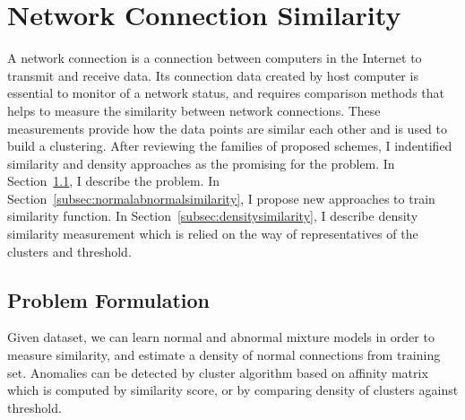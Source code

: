 \section{Network Connection Similarity}
\label{sec:connectionsimilarity}
A network connection is a connection between computers in the Internet to transmit and receive data. 
Its connection data created by host computer is essential to monitor of a network status, and requires comparison methods that helps to measure the similarity between network connections. 
These measurements provide how the data points are similar each other and is used to build a clustering. 
After reviewing the families of proposed schemes, I indentified similarity and density approaches as the promising for the problem.
\newline
In Section~\ref{subsec:problemformulation}, I describe the problem.\newline
In Section~\ref{subsec:normalabnormalsimilarity}, I propose new approaches to train similarity function.\newline
In Section~\ref{subsec:densitysimilarity}, I describe density similarity measurement which is relied on the way of representatives of the clusters and threshold.\newline

\subsection{Problem Formulation}
\label{subsec:problemformulation}
Given dataset, we can learn normal and abnormal mixture models in order to measure similarity, and estimate a density of normal connections from training set.
Anomalies can be detected by cluster algorithm based on affinity matrix which is computed by similarity score, or by comparing density of clusters against threshold.

